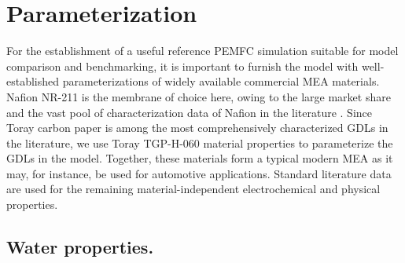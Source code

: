 \documentclass[fontsize=9pt,DIV=calc,a4paper,twocolumn]{scrartcl}
\begin{document}
\section{Parameterization}

For the establishment of a useful reference PEMFC simulation suitable for model comparison and benchmarking, it is important to furnish the model with well-established parameterizations of widely available commercial MEA materials. Nafion NR-211 is the membrane of choice here, owing to the large market share and the vast pool of characterization data of Nafion in the literature \cite{kusoglu:17}. Since Toray carbon paper is among the most comprehensively characterized GDLs in the literature, we use Toray TGP-H-060 material properties to parameterize the GDLs in the model. Together, these materials form a typical modern MEA as it may, for instance, be used for automotive applications. Standard literature data are used for the remaining material-independent electrochemical and physical properties.

\subsection*{Water properties.}
\end{document}
